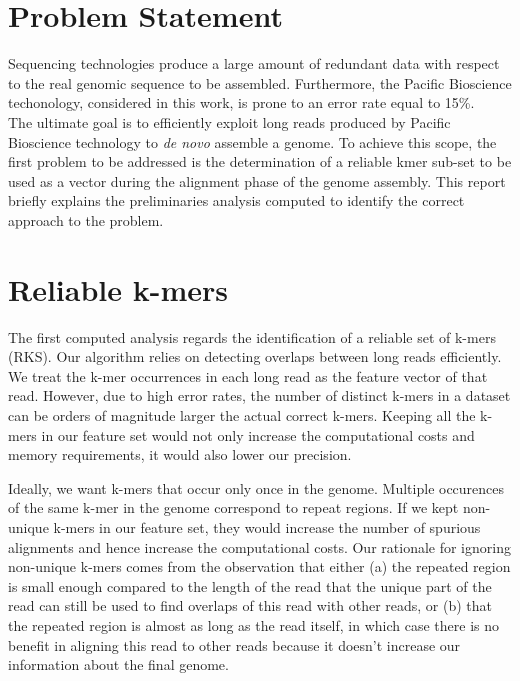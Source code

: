 \documentclass[11pt]{article}
\begin{document}
\maketitle

\section{Problem Statement}

Sequencing technologies produce a large amount of redundant data with respect to the real genomic sequence to be assembled.
Furthermore, the Pacific Bioscience techonology, considered in this work, is prone to an error rate equal to 15\%.\\
The ultimate goal is to efficiently exploit long reads produced by Pacific Bioscience technology to \emph{de novo} assemble a genome.
To achieve this scope, the first problem to be addressed is the determination of a reliable kmer sub-set to be used as a vector during the alignment phase of the genome assembly.
This report briefly explains the preliminaries analysis computed to identify the correct approach to the problem.
\section{Reliable k-mers}\label{rks}

The first computed analysis regards the identification of a reliable set of k-mers (RKS). Our algorithm relies on detecting overlaps between long reads efficiently. We treat the k-mer occurrences in each long read as the feature vector of that read. However, due to high error rates, the number of distinct k-mers in a dataset can be orders of magnitude larger the actual correct k-mers. Keeping all the k-mers in our feature set would not only increase the computational costs and memory requirements, it would also lower our precision.

Ideally, we want k-mers that occur only once in the genome. Multiple occurences of the same k-mer in the genome correspond to repeat regions. If we kept non-unique k-mers in our feature set, they would increase the number of spurious alignments and hence increase the computational costs. Our rationale for ignoring non-unique k-mers comes from the observation that either (a) the repeated region is small enough compared to the length of the read that the unique part of the read can still be used to find overlaps of this read with other reads, or (b) that the repeated region is almost as long as the read itself, in which case there is no benefit in aligning this read to other reads because it doesn't increase our information about the final genome. 
\end{document}
